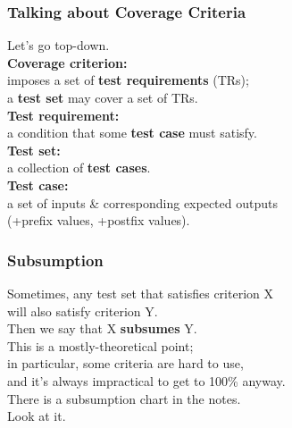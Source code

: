 \documentclass{beamer}
\newenvironment{changemargin}[1]{%
  \begin{list}{}{%
    \setlength{\topsep}{0pt}%
    \setlength{\leftmargin}{#1}%
    \setlength{\rightmargin}{1em}
    \setlength{\listparindent}{\parindent}%
    \setlength{\itemindent}{\parindent}%
    \setlength{\parsep}{\parskip}%
  }%
  \item[]}{\end{list}}
\begin{document}
\begin{frame}
  \frametitle{Talking about Coverage Criteria}

  \begin{changemargin}{1cm}
  Let's go top-down.\\[1em]

  {\bf Coverage criterion:} \\
  \hspace*{2cm} imposes a set of {\bf test requirements} (TRs);\\
  \hspace*{2cm} a {\bf test set} may cover a set of TRs.\\[1em]

  {\bf Test requirement:} \\
  \hspace*{2cm} a condition that some {\bf test case} must satisfy.\\[1em]

  {\bf Test set:} \\
  \hspace*{2cm} a collection of {\bf test cases}.\\[1em]
  
  {\bf Test case:} \\
  \hspace*{2cm} a set of inputs \& corresponding expected outputs\\
  \hspace*{3cm} (+prefix values, +postfix values).\\
  
  \end{changemargin}
  
\end{frame}

\begin{frame}
  \frametitle{Subsumption}

  \begin{changemargin}{2cm}
    Sometimes, any test set that satisfies criterion X \\ will also satisfy criterion Y.\\[1em]
    Then we say that X {\bf subsumes} Y.\\[1em]
    This is a mostly-theoretical point; \\
    in particular, some criteria are hard to use,\\
    and it's always impractical to get to 100\% anyway.\\[1em]
    There is a subsumption chart in the notes. \\
    Look at it.
  \end{changemargin}
\end{frame}
\end{document}
